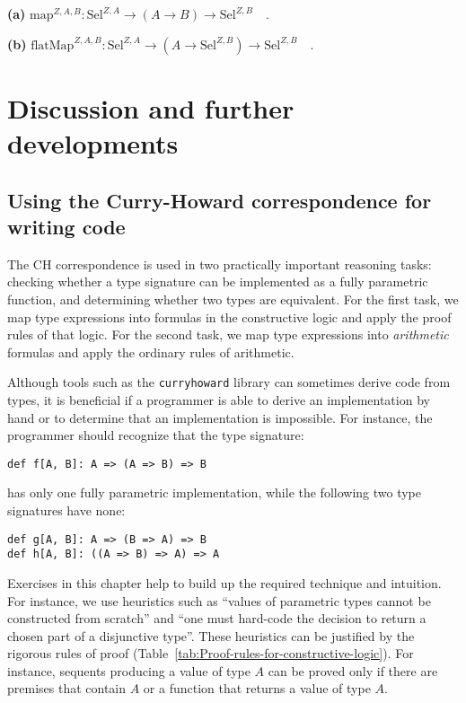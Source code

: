 \textbf{(a)} $\text{map}^{Z,A,B}:\text{Sel}^{Z,A}\rightarrow\left(A\rightarrow B\right)\rightarrow\text{Sel}^{Z,B}\quad.$

\textbf{(b)} $\text{flatMap}^{Z,A,B}:\text{Sel}^{Z,A}\rightarrow(A\rightarrow\text{Sel}^{Z,B})\rightarrow\text{Sel}^{Z,B}\quad.$

\section{Discussion and further developments}

\subsection{Using the Curry-Howard correspondence for writing code}

The CH correspondence is used in two practically important reasoning
tasks: checking whether a type signature can be implemented as a fully
parametric function, and determining whether two types are equivalent.
For the first task, we map type expressions into formulas in the constructive
logic and apply the proof rules of that logic. For the second task,
we map type expressions into \emph{arithmetic} formulas and apply
the ordinary rules of arithmetic.

Although tools such as the \lstinline!curryhoward! library can sometimes
derive code from types, it is beneficial if a programmer is able to
derive an implementation by hand or to determine that an implementation
is impossible. For instance, the programmer should recognize that
the type signature:
\begin{lstlisting}
def f[A, B]: A => (A => B) => B
\end{lstlisting}
has only one fully parametric implementation, while the following
two type signatures have none:
\begin{lstlisting}
def g[A, B]: A => (B => A) => B
def h[A, B]: ((A => B) => A) => A
\end{lstlisting}
Exercises in this chapter help to build up the required technique
and intuition. For instance, we use heuristics such as \textsf{``}values of
parametric types cannot be constructed from scratch\textsf{''} and \textsf{``}one
must hard-code the decision to return a chosen part of a disjunctive
type\textsf{''}. These heuristics can be justified by the rigorous rules of
proof (Table~\ref{tab:Proof-rules-for-constructive-logic}). For
instance, sequents producing a value of type $A$ can be proved only
if there are premises that contain $A$ or a function that returns
a value of type $A$.

